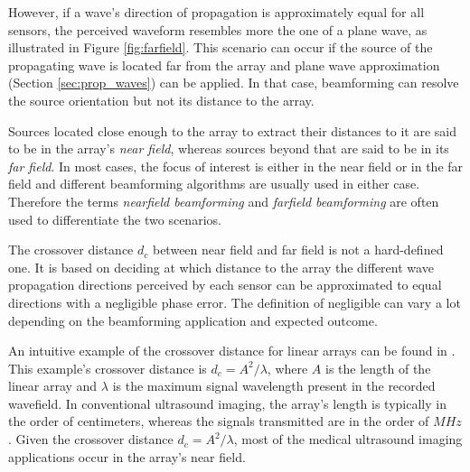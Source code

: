 However, if a wave's direction of propagation is approximately equal for all sensors, the perceived waveform resembles more the one of a plane wave, as illustrated in Figure \ref{fig:farfield}. This scenario can occur if the source of the propagating wave is located far from the array and plane wave approximation (Section \ref{sec:prop_waves}) can be applied. In that case, beamforming can resolve the source orientation but not its distance to the array.

Sources located close enough to the array to extract their distances to it are said to be in the array's \textit{near field}, whereas sources beyond that are said to be in its \textit{far field}. In most cases, the focus of interest is either in the near field or in the far field and different beamforming algorithms are usually used in either case. Therefore the terms \textit{nearfield beamforming} and \textit{farfield beamforming} are often used to differentiate the two scenarios.

The crossover distance $d_c$ between near field and far field is not a hard-defined one. It is based on deciding at which distance to the array the different wave propagation directions perceived by each sensor can be approximated to equal directions with a negligible phase error. The definition of negligible can vary a lot depending on the beamforming application and expected outcome.

An intuitive example of the crossover distance for linear arrays can be found in \cite{wright_compendium}. This example's crossover distance is $d_c = A^2 / \lambda$, where $A$ is the length of the linear array and $\lambda$ is the maximum signal wavelength present in the recorded wavefield.
In conventional ultrasound imaging, the array's length is typically in the order of centimeters, whereas the signals transmitted are in the order of $MHz$. Given the crossover distance $d_c = A^2 / \lambda$, most of the medical ultrasound imaging applications occur in the array's near field.

